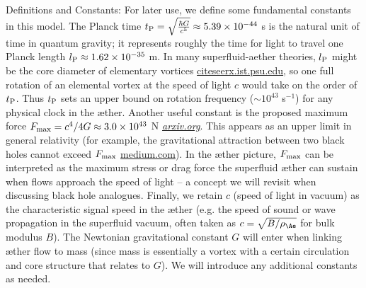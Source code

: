 Definitions and Constants: For later use, we define some fundamental constants in this model. The Planck time $t_{\rm P} = \sqrt{\frac{\hbar G}{c^5}} \approx 5.39\times10^{-44}$ s is the natural unit of time in quantum gravity; it represents roughly the time for light to travel one Planck length $l_{\rm P}\approx1.62\times10^{-35}$ m. In many superfluid-aether theories, $l_{\rm P}$ might be the core diameter of elementary vortices
\href{https://citeseerx.ist.psu.edu/document?repid=rep1&type=pdf&doi=25483f1ebc9dc442a9f1505a49d96eb35e92e3f4#:~:text=45,on%20General%20Relativity%20and%20Relativistic}{citeseerx.ist.psu.edu}, so one full rotation of an elemental vortex at the speed of light $c$ would take on the order of $t_{\rm P}$. Thus $t_{\rm P}$ sets an upper bound on rotation frequency ($\sim10^{43}$ s$^{-1}$) for any physical clock in the æther. Another useful constant is the proposed maximum force $F_{\rm max}=c^4/4G \approx 3.0\times10^{43}$ N
\href{https://arxiv.org/abs/2205.06302#:~:text=the%20principle%20of%20maximum%20force,The%20limits%20illuminate}{\textit{arxiv.org}}. This appears as an upper limit in general relativity (for example, the gravitational attraction between two black holes cannot exceed $F_{\rm max}$
\href{https://medium.com/@motionmountain/4-there-is-a-maximum-force-in-nature-d87e1951e9a4#:~:text=,implies%20inverse%20square%20gravity}{medium.com}). In the æther picture, $F_{\rm max}$ can be interpreted as the maximum stress or drag force the superfluid æther can sustain when flows approach the speed of light – a concept we will revisit when discussing black hole analogues. Finally, we retain $c$ (speed of light in vacuum) as the characteristic signal speed in the æther (e.g. the speed of sound or wave propagation in the superfluid vacuum, often taken as $c=\sqrt{B/\rho_{\Ae}}$ for bulk modulus $B$). The Newtonian gravitational constant $G$ will enter when linking æther flow to mass (since mass is essentially a vortex with a certain circulation and core structure that relates to $G$). We will introduce any additional constants as needed.
